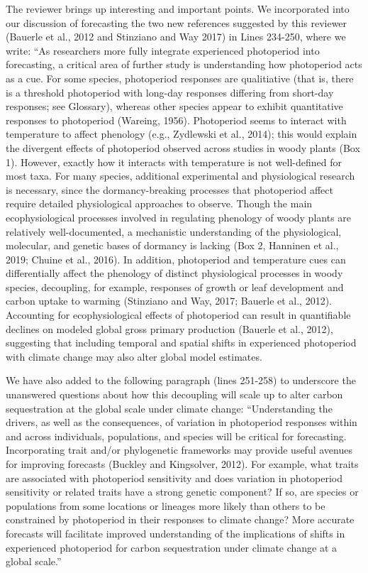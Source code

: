 \documentclass{article}
\begin{document}
\par  The reviewer brings up interesting and important points. We incorporated into our discussion of forecasting the two new references suggested by this reviewer (Bauerle et al., 2012 and Stinziano and Way 2017) in Lines 234-250, where we write: ``As researchers more fully integrate experienced photoperiod into forecasting, a critical area of further study is understanding how photoperiod acts as a cue.  For some species,  photoperiod responses are qualitiative (that  is,  there  is  a  threshold  photoperiod  with  long-day  responses  differing  from  short-day  responses;  see Glossary), whereas other species appear to exhibit quantitative responses to photoperiod (Wareing, 1956). Photoperiod seems to interact with temperature to affect phenology (e.g., Zydlewski et al., 2014); this would explain  the  divergent  effects  of  photoperiod  observed  across  studies  in  woody  plants  (Box  1).   However, exactly how it interacts with temperature is not well-defined for most taxa.  For many species,  additional experimental and physiological research is necessary, since the dormancy-breaking processes that photoperiod affect  require  detailed  physiological  approaches  to  observe.   Though  the  main  ecophysiological  processes involved in regulating phenology of woody plants are relatively well-documented, a mechanistic understanding of the physiological, molecular, and genetic bases of dormancy is lacking (Box 2, Hanninen et al., 2019; Chuine et al., 2016).  In addition, photoperiod and temperature cues can differentially affect the phenology of distinct physiological processes in woody species, decoupling, for example, responses of growth or leaf development and carbon uptake to warming (Stinziano and Way, 2017; Bauerle et al., 2012).  Accounting for ecophysiological effects of photoperiod can result in quantifiable declines on modeled global gross primary production (Bauerle et al., 2012), suggesting that including temporal and spatial shifts in experienced photoperiod with climate change may also alter global model estimates.

\par We have also added to the following paragraph (lines 251-258) to underscore the unanswered questions about how this decoupling will scale up to alter carbon sequestration at the global scale under climate change:
``Understanding the drivers, as well as the consequences, of variation in photoperiod responses within and across individuals, populations, and species will be critical for forecasting. Incorporating trait and/or phylogenetic frameworks may provide useful avenues for improving forecasts (Buckley and Kingsolver, 2012). For example, what traits are associated with photoperiod sensitivity and does variation in photoperiod sensitivity or related  traits have a strong genetic component? If so, are species or populations from some locations or lineages more likely than others to be constrained by photoperiod in their responses to climate change? More accurate forecasts will facilitate improved understanding of the implications of shifts in experienced photoperiod for carbon sequestration under climate change at a global scale.''
\end{document}
